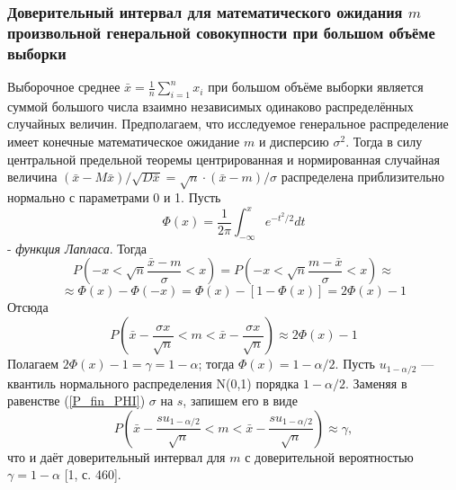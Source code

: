 \documentclass[a4paper]{article}
\begin{document}
    \subsubsection{Доверительный интервал для математического ожидания $m$ произвольной генеральной совокупности при большом объёме выборки}
    Выборочное среднее $\bar{x} = \frac{1}{n}\sum_{i = 1}^{n}{x_{i}}$ при большом объёме выборки является суммой большого числа взаимно независимых одинаково распределённых случайных величин. Предполагаем, что исследуемое генеральное распределение имеет конечные математическое ожидание $m$ и дисперсию $\sigma^{2}$. Тогда в силу центральной предельной теоремы центрированная и нормированная случайная величина $(\bar{x} - M\bar{x}) / \sqrt{D\bar{x}} = \sqrt{n}·(\bar{x}-m)/\sigma$ распределена приблизительно нормально с параметрами 0 и 1. Пусть
    \begin{equation}
        \Phi(x) = \frac{1}{2\pi}\int_{-\infty}^{x}{e^{-t^{2}/2}dt}
        \label{f_lapl}
    \end{equation}
    - \textit{функция Лапласа}. Тогда
    $$
    P\left(-x < \sqrt{n}\frac{\bar{x} - m}{\sigma} < x \right) = 
    P\left(-x < \sqrt{n}\frac{m - \bar{x}}{\sigma} < x \right) \approx
    $$
    $$
        \approx \Phi(x) - \Phi(-x)=\Phi(x) - [1 - \Phi(x)] = 2\Phi(x) - 1
    $$
    Отсюда
    \begin{equation}
        P\left(\bar{x} - \frac{\sigma x}{\sqrt{n}} < m < \bar{x} - \frac{\sigma x}{\sqrt{n}} \right) \approx 2\Phi(x) - 1
        \label{P_fin_PHI}
    \end{equation}
    Полагаем $2\Phi(x) - 1 = \gamma = 1 - \alpha$; тогда $\Phi(x) = 1 - \alpha/2$. Пусть $u_{1-\alpha/2}$ — квантиль нормального распределения N(0,1) порядка $1-\alpha/2$. Заменяя в равенстве (\ref{P_fin_PHI}) $\sigma$ на $s$, запишем его в виде
    \begin{equation}
        P\left(\bar{x} - \frac{su_{1-\alpha/2}}{\sqrt{n}} < m < \bar{x} - \frac{su_{1-\alpha/2}}{\sqrt{n}} \right) \approx \gamma,
        \label{P_fin_u}
    \end{equation}
    что и даёт доверительный интервал для $m$ с доверительной вероятностью $\gamma = 1-\alpha$ [1, с. 460].
    
\end{document}
